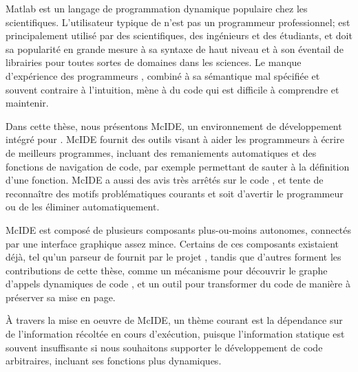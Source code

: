 {\sc Matlab}\textsuperscript{\textregistered} est un langage de programmation
dynamique populaire chez les scientifiques. L'utilisateur typique de \matlab
n'est pas un programmeur professionnel; \matlab est
principalement utilis\'{e} par des scientifiques, des ing\'{e}nieurs et des
\'{e}tudiants, et doit sa popularit\'{e} en grande mesure \`{a} sa syntaxe de
haut niveau et \`{a} son \'{e}ventail de librairies pour toutes sortes de
domaines dans les sciences. Le manque d'exp\'{e}rience des programmeurs
\matlab, combin\'{e} \`{a} sa s\'{e}mantique mal sp\'{e}cifi\'{e}e et
souvent contraire \`{a} l'intuition, m\`{e}ne \`{a} du code \matlab qui est
difficile \`{a} comprendre et maintenir.

Dans cette th\`{e}se, nous pr\'{e}sentons McIDE, un environnement de
d\'{e}veloppement int\'{e}gr\'{e} pour \matlab. McIDE fournit des outils visant
\`{a} aider les programmeurs \matlab \`{a} \'{e}crire de meilleurs programmes,
incluant des remaniements automatiques et des fonctions de navigation de code,
par exemple permettant de sauter \`{a} la d\'{e}finition d'une fonction. McIDE
a aussi des avis tr\`{e}s arr\^{e}t\'{e}s sur le code \matlab, et tente de
reconna\^{i}tre des motifs probl\'{e}matiques courants et soit d'avertir le
programmeur ou de les \'{e}liminer automatiquement.

McIDE est compos\'{e} de plusieurs composants plus-ou-moins autonomes,
connect\'{e}s par une interface graphique assez mince. Certains de ces
composants existaient d\'{e}j\`{a}, tel qu'un parseur de \matlab fournit par le
projet \mclab, tandis que d'autres forment les contributions de cette
th\`{e}se, comme un m\'{e}canisme pour d\'{e}couvrir le graphe d'appels
dynamiques de code \matlab, et un outil pour transformer du code de mani\`{e}re
\`{a} pr\'{e}server sa mise en page.

\`{A} travers la mise en oeuvre de McIDE, un th\`{e}me courant est la
d\'{e}pendance sur de l'information r\'{e}colt\'{e}e en cours
d'ex\'{e}cution, puisque l'information statique est souvent insuffisante si
nous souhaitons supporter le d\'{e}veloppement de code \matlab arbitraires,
incluant ses fonctions plus dynamiques.
